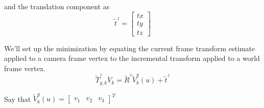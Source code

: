 \documentclass[12pt]{article}
\begin{document}
and the translation component as
\begin{equation}
\tilde{t}^{z} = 
\begin{bmatrix}
tx \\ ty \\ tz
\end{bmatrix}
\end{equation}
  
We'll set up the minimization by equating the current frame transform estimate applied to a camera frame vertex to the incremental transform applied to a world frame vertex.
\begin{equation}
\tilde{T}_{g,k}^{z} \dot{V}_{k}= \tilde{R}^{z} \tilde{V}_{k}^{g}(u) + \tilde{t}^{z}
\end{equation}
  
Say that $\tilde{V}_{k}^{g}(u) = \begin{bmatrix} v_{1} & v_{2} & v_{3} \end{bmatrix}^{T}$
  
\end{document}
